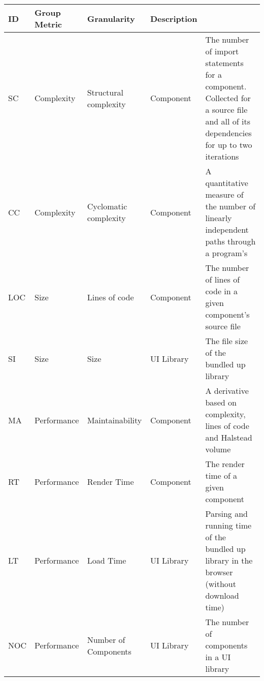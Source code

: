 \begin{table}[htbp]
  \tiny
  \begin{tabularx}{\textwidth}{|l|l|l|l|X|}
    \toprule
    \textbf{ID} & \textbf{Group} \textbf{Metric} & \textbf{Granularity}   & \textbf{Description}                                                                                                                                                 \\ \midrule
    SC          & Complexity                     & Structural complexity  & Component                        & The number of import statements for a component. Collected for a source file and all of its dependencies for up to two iterations \\ \hline
    CC          & Complexity                     & Cyclomatic complexity  & Component                        & A quantitative measure of the number of linearly independent paths through a program's~\cite{1702388}                             \\ \hline
    LOC         & Size                           & Lines of code          & Component                        & The number of lines of code in a given component's source file                                                                    \\ \hline
    SI          & Size                           & Size                   & UI Library                       & The file size of the bundled up library                                                                                           \\ \hline
    MA          & Performance                    & Maintainability        & Component                        & A derivative based on complexity, lines of code and Halstead volume~\cite{halstead1977elements}                                   \\ \hline
    RT          & Performance                    & Render Time            & Component                        & The render time of a given component                                                                                              \\ \hline
    LT          & Performance                    & Load Time              & UI Library                       & Parsing and running time of the bundled up library in the browser (without download time)                                         \\ \hline
    NOC         & Performance                    & Number of Components   & UI Library                       & The number of components in a UI library                                                                                          \\ \hline

\end{tabularx}
\end{table}
